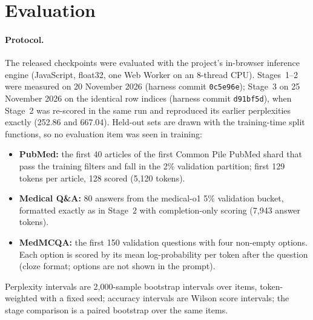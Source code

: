 \documentclass[11pt,a4paper]{article}
\begin{document}
\section{Evaluation}

\paragraph{Protocol.} The released checkpoints were evaluated with the project's in-browser inference engine (JavaScript, float32, one Web Worker on an 8-thread CPU). Stages~1--2 were measured on 20 November 2026 (harness commit \texttt{0c5e96e}); Stage~3 on 25 November 2026 on the identical row indices (harness commit \texttt{d91bf5d}), when Stage~2 was re-scored in the same run and reproduced its earlier perplexities exactly (252.86 and 667.04). Held-out sets are drawn with the training-time split functions, so no evaluation item was seen in training:
\begin{itemize}
  \item \textbf{PubMed:} the first 40 articles of the first Common Pile PubMed shard that pass the training filters and fall in the 2\% validation partition; first 129 tokens per article, 128 scored (5,120 tokens).
  \item \textbf{Medical Q\&A:} 80 answers from the medical-o1 5\% validation bucket, formatted exactly as in Stage~2 with completion-only scoring (7,943 answer tokens).
  \item \textbf{MedMCQA:} the first 150 validation questions with four non-empty options. Each option is scored by its mean log-probability per token after the question (cloze format; options are not shown in the prompt).
\end{itemize}
Perplexity intervals are 2,000-sample bootstrap intervals over items, token-weighted with a fixed seed; accuracy intervals are Wilson score intervals; the stage comparison is a paired bootstrap over the same items.
\end{document}
